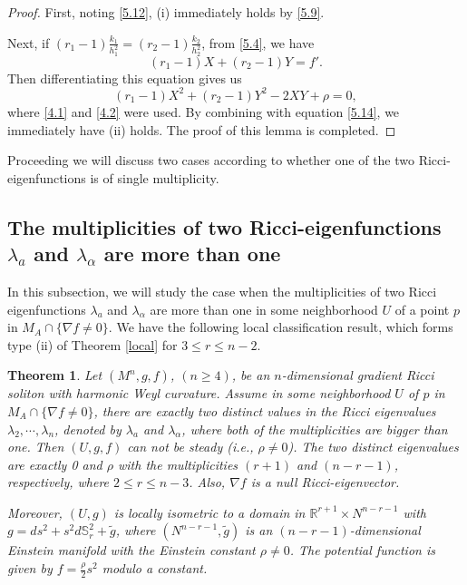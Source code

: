 \documentclass{amsart}
\newtheorem{theorem}{Theorem}[section]
\theoremstyle{definition}
\theoremstyle{remark}
\numberwithin{equation}{section}
\begin{document}
\begin{proof}
	First, noting \eqref{5.12}, (i) immediately holds by \eqref{5.9}.
	
	Next, if $(r_1-1)\frac{k_1}{h^2_1}=(r_2-1)\frac{k_2}{h^2_2}$, from \eqref{5.4}, we have
	\[
	(r_1-1)X+(r_2-1)Y=f'.
	\]
	Then differentiating this equation gives us
	\[
	(r_1-1)X^2+(r_2-1)Y^2-2XY+\rho=0,
	\]
	where \eqref{4.1} and \eqref{4.2} were used.
	By combining with equation \eqref{5.14}, we immediately have (ii) holds. 
The proof of this lemma is completed. 	
\end{proof}
Proceeding we will discuss two cases according to 
whether one of the two Ricci-eigenfunctions is of single multiplicity.

\subsection{The multiplicities of two Ricci-eigenfunctions $\lambda_a$ and $\lambda_\alpha$ are more than one}
In this subsection, we will study the case when the multiplicities of two Ricci eigenfunctions 
$\lambda_a$ and $\lambda_\alpha$ are more than one in some neighborhood $U$ of a point $p$ in $M_A \cap \{ \nabla f \neq 0  \}$.
We have the following local classification result, 
which forms type {\rm (ii)} of Theorem \ref{local} for $3\leq r\leq n-2$.
	
\begin{theorem} \label{twodis}
	Let $(M^n, g, f)$, $(n\geq 4)$, be an $n$-dimensional gradient Ricci soliton with harmonic Weyl curvature.
	Assume in some neighborhood $U$ of $p$ in $M_A \cap \{ \nabla f \neq 0  \}$, there are exactly two distinct values in the Ricci eigenvalues $\lambda_2, \cdots, \lambda_n$, denoted by $\lambda_a$ and $\lambda_\alpha$, where both of the multiplicities are bigger than one. 
	Then $(U,g,f)$ can not be steady (i.e., $\rho\neq0$). The two distinct eigenvalues are exactly  0 and $\rho$ with the multiplicities $(r+1)$ and $(n-r-1)$, respectively, where $2\leq r\leq n-3$. 
	Also, $\nabla f$ is a null Ricci-eigenvector.
	
	Moreover, $(U,g)$ is locally isometric to a domain in 
	$\mathbb{R}^{r+1}\times N^{n-r-1}$
	with $g= ds^2 + s^2d\mathbb{S}^2_{r}+\tilde{g} $,
	where $\left(N^{n-r-1}, \tilde{g}\right)$ 
	is an $(n-r-1)$-dimensional Einstein manifold
	with the Einstein constant $\rho\neq 0$.
	The potential function is given by $f = \frac{\rho}{2}s^2$ modulo a constant.
	\end{theorem}
\end{document}
